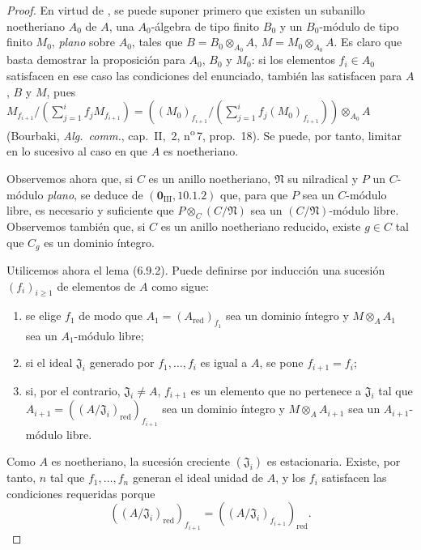 \begin{proof}
En virtud de , se puede suponer primero que existen un subanillo noetheriano $A_0$ de $A$, una $A_0$-álgebra de tipo finito $B_0$ y un $B_0$-módulo de tipo finito $M_0$, \emph{plano} sobre $A_0$, tales que
$B=B_0\otimes_{A_0}A$, $M=M_0\otimes_{A_0}A$.
Es claro que basta demostrar la proposición para $A_0$, $B_0$ y $M_0$: si los elementos $f_i\in A_0$ satisfacen en ese caso las condiciones del enunciado, también las satisfacen para $A$, $B$ y $M$, pues
$M_{f_{i+1}}/(\sum_{j=1}^{i}f_jM_{f_{i+1}})
=((M_0)_{f_{i+1}}/(\sum_{j=1}^{i}f_j(M_0)_{f_{i+1}}))
\otimes_{A_0}A$
(Bourbaki, \emph{Alg.\ comm.}, cap.~II, \textsection\,2, n\textsuperscript{o}\,7, prop.~18). Se puede, por tanto, limitar en lo sucesivo al caso en que $A$ es noetheriano.

Observemos ahora que, si $C$ es un anillo noetheriano, $\mathfrak N$ su nilradical y $P$ un $C$-módulo \emph{plano}, se deduce de $(\mathbf 0_{\mathrm{III}},10.1.2)$ que, para que $P$ sea un $C$-módulo libre,  es necesario y suficiente que $P\otimes_C(C/\mathfrak N)$ sea un $(C/\mathfrak N)$-módulo libre. Observemos también que, si $C$ es un anillo noetheriano reducido, existe $g\in C$ tal que $C_g$ es un dominio íntegro.

Utilicemos ahora el lema (6.9.2). Puede definirse por inducción una sucesión $(f_i)_{i\geq1}$ de elementos de $A$ como sigue:
\begin{enumerate}
\item[$1^\circ$] se elige $f_1$ de modo que
$A_1=(A_{\mathrm{red}})_{f_1}$
sea un dominio íntegro y $M\otimes_A A_1$ sea un $A_1$-módulo libre;
\item[$2^\circ$] si el ideal $\mathfrak J_i$ generado por $f_1,\ldots,f_i$ es igual a $A$, se pone $f_{i+1}=f_i$;
\item[$3^\circ$] si, por el contrario, $\mathfrak J_i\neq A$, $f_{i+1}$ es un elemento que no pertenece a $\mathfrak J_i$ tal que
$A_{i+1}=((A/\mathfrak J_i)_{\mathrm{red}})_{f_{i+1}}$
sea un dominio íntegro y $M\otimes_A A_{i+1}$ sea un $A_{i+1}$-módulo libre.
\end{enumerate}
Como $A$ es noetheriano, la sucesión creciente $(\mathfrak J_i)$ es estacionaria. Existe, por tanto, $n$ tal que $f_1,\ldots,f_n$ generan el ideal unidad de $A$, y los $f_i$ satisfacen las condiciones requeridas porque
\[
((A/\mathfrak J_i)_{\mathrm{red}})_{f_{i+1}}
=((A/\mathfrak J_i)_{f_{i+1}})_{\mathrm{red}}.
\]
\end{proof}

